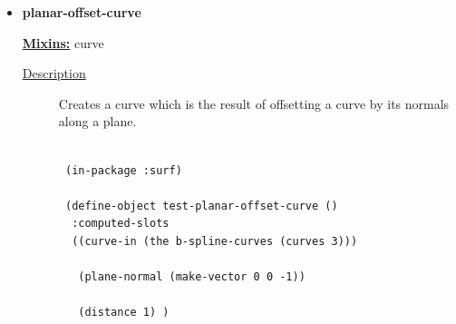 \documentclass [11pt]{book}
\begin{document}
\begin{itemize}







\item {}
\label{prim:planar-offset-curve}
\textbf{planar-offset-curve}


\textbf{
\underline{Mixins:}} curve





\begin{description}

\item [
\underline{Description}]


Creates a curve which is the result of offsetting a curve by its normals along a plane.



\end{description}




\begin{figure}
\begin{lrbox}{\boxedverb}
\begin{minipage}{\linewidth}
{\small

\begin{verbatim}
 
 (in-package :surf)

 (define-object test-planar-offset-curve ()
  :computed-slots
  ((curve-in (the b-spline-curves (curves 3)))
   
   (plane-normal (make-vector 0 0 -1))
   
   (distance 1) )
  

\end{verbatim}}
\end{minipage}
\end{lrbox}
\end{figure}
\end{itemize}
\end{document}
